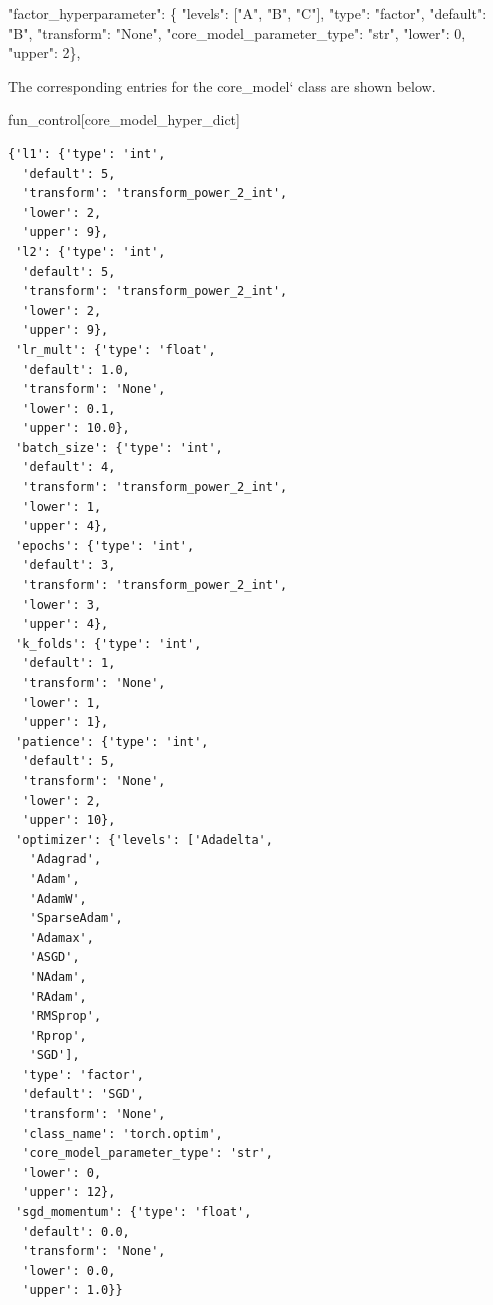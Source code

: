 \documentclass[
  letterpaper,
  DIV=11,
  numbers=noendperiod]{scrreprt}
\newenvironment{Shaded}{\begin{snugshade}}{\end{snugshade}}
\newcommand{\DataTypeTok}[1]{\textcolor[rgb]{0.68,0.00,0.00}{#1}}
\newcommand{\DecValTok}[1]{\textcolor[rgb]{0.68,0.00,0.00}{#1}}
\newcommand{\ErrorTok}[1]{\textcolor[rgb]{0.68,0.00,0.00}{#1}}
\newcommand{\FunctionTok}[1]{\textcolor[rgb]{0.28,0.35,0.67}{#1}}
\newcommand{\NormalTok}[1]{\textcolor[rgb]{0.00,0.23,0.31}{#1}}
\newcommand{\OtherTok}[1]{\textcolor[rgb]{0.00,0.23,0.31}{#1}}
\newcommand{\StringTok}[1]{\textcolor[rgb]{0.13,0.47,0.30}{#1}}
\begin{document}
\begin{Shaded}
\begin{Highlighting}[]
\ErrorTok{"factor\_hyperparameter":} \FunctionTok{\{}
    \DataTypeTok{"levels"}\FunctionTok{:} \OtherTok{[}\StringTok{"A"}\OtherTok{,} \StringTok{"B"}\OtherTok{,} \StringTok{"C"}\OtherTok{]}\FunctionTok{,}
    \DataTypeTok{"type"}\FunctionTok{:} \StringTok{"factor"}\FunctionTok{,}
    \DataTypeTok{"default"}\FunctionTok{:} \StringTok{"B"}\FunctionTok{,}
    \DataTypeTok{"transform"}\FunctionTok{:} \StringTok{"None"}\FunctionTok{,}
    \DataTypeTok{"core\_model\_parameter\_type"}\FunctionTok{:} \StringTok{"str"}\FunctionTok{,}
    \DataTypeTok{"lower"}\FunctionTok{:} \DecValTok{0}\FunctionTok{,}
    \DataTypeTok{"upper"}\FunctionTok{:} \DecValTok{2}\FunctionTok{\}}\ErrorTok{,}
\end{Highlighting}
\end{Shaded}

The corresponding entries for the core\_model` class are shown below.

\begin{Shaded}
\begin{Highlighting}[]
\NormalTok{fun\_control[}\StringTok{\textquotesingle{}core\_model\_hyper\_dict\textquotesingle{}}\NormalTok{]}
\end{Highlighting}
\end{Shaded}

\begin{verbatim}
{'l1': {'type': 'int',
  'default': 5,
  'transform': 'transform_power_2_int',
  'lower': 2,
  'upper': 9},
 'l2': {'type': 'int',
  'default': 5,
  'transform': 'transform_power_2_int',
  'lower': 2,
  'upper': 9},
 'lr_mult': {'type': 'float',
  'default': 1.0,
  'transform': 'None',
  'lower': 0.1,
  'upper': 10.0},
 'batch_size': {'type': 'int',
  'default': 4,
  'transform': 'transform_power_2_int',
  'lower': 1,
  'upper': 4},
 'epochs': {'type': 'int',
  'default': 3,
  'transform': 'transform_power_2_int',
  'lower': 3,
  'upper': 4},
 'k_folds': {'type': 'int',
  'default': 1,
  'transform': 'None',
  'lower': 1,
  'upper': 1},
 'patience': {'type': 'int',
  'default': 5,
  'transform': 'None',
  'lower': 2,
  'upper': 10},
 'optimizer': {'levels': ['Adadelta',
   'Adagrad',
   'Adam',
   'AdamW',
   'SparseAdam',
   'Adamax',
   'ASGD',
   'NAdam',
   'RAdam',
   'RMSprop',
   'Rprop',
   'SGD'],
  'type': 'factor',
  'default': 'SGD',
  'transform': 'None',
  'class_name': 'torch.optim',
  'core_model_parameter_type': 'str',
  'lower': 0,
  'upper': 12},
 'sgd_momentum': {'type': 'float',
  'default': 0.0,
  'transform': 'None',
  'lower': 0.0,
  'upper': 1.0}}
\end{verbatim}
\end{document}
